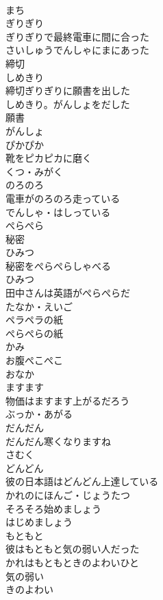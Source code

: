 \documentclass[8pt]{extreport}
\begin{document}
\begin{CJK}{UTF8}{min}
\\	まち
\\	ぎりぎり	
\\	ぎりぎりで最終電車に間に合った	
\\	さいしゅうでんしゃにまにあった
\\	締切	
\\	しめきり
\\	締切ぎりぎりに願書を出した	
\\	しめきり。がんしょをだした
\\	願書	
\\	がんしょ
\\	ぴかぴか	
\\	靴をピカピカに磨く	
\\	くつ・みがく
\\	のろのろ	
\\	電車がのろのろ走っている	
\\	でんしゃ・はしっている
\\	ぺらぺら	
\\	秘密	
\\	ひみつ
\\	秘密をぺらぺらしゃべる	
\\	ひみつ
\\	田中さんは英語がぺらぺらだ	
\\	たなか・えいご
\\	ペラペラの紙		
\\	ぺらぺらの紙	
\\	かみ
\\	お腹ぺこぺこ	
\\	おなか
\\	ますます	
\\	物価はますます上がるだろう	
\\	ぶっか・あがる
\\	だんだん	
\\	だんだん寒くなりますね	
\\	さむく
\\	どんどん	
\\	彼の日本語はどんどん上達している	
\\	かれのにほんご・じょうたつ
\\	そろそろ始めましょう	
\\	はじめましょう
\\	もともと	
\\	彼はもともと気の弱い人だった	
\\	かれはもともときのよわいひと
\\	気の弱い	
\\	きのよわい

\end{CJK}
\end{document}
